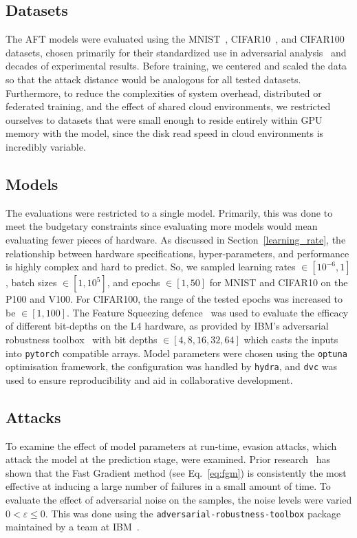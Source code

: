\documentclass[sn-mathphys-num]{sn-jnl}%
\begin{document}
\subsection{Datasets}

The AFT models were evaluated using the MNIST~\cite{mnist}, CIFAR10~\cite{cifar}, and CIFAR100~\cite{cifar} datasets, chosen primarily for their standardized use in adversarial analysis~\cite{madry2017towards,croce_reliable_2020,carlini_towards_2017,deepfool} and decades of experimental results.
Before training, we centered and scaled the data so that the attack distance would be analogous for all tested datasets. Furthermore, to reduce the complexities of system overhead, distributed or federated training, and the effect of shared cloud environments, we restricted ourselves to datasets that were small enough to reside entirely within GPU memory with the model, since the disk read speed in cloud environments is incredibly variable.


\subsection{Models}

The evaluations were restricted to a single model. Primarily, this was done to meet the budgetary constraints since evaluating more models would mean evaluating fewer pieces of hardware. As discussed in Section~\ref{learning_rate}, the relationship between hardware specifications, hyper-parameters, and performance is highly complex and hard to predict. So, we sampled learning rates $\in [10^{-6}, 1]$, batch sizes $\in [1, 10^5]$, and epochs $\in [1, 50]$ for MNIST and CIFAR10 on the P100 and V100. For CIFAR100, the range of the tested epochs was increased to be $\in [1, 100]$. The Feature Squeezing defence~\cite{feature_squeezing} was used to evaluate the efficacy of different bit-depths on the L4 hardware, as provided by IBM's adversarial robustness toolbox~\cite{art2018} with bit depths $\in [4,8,16,32,64]$ which casts the inputs into \texttt{pytorch} compatible arrays. Model parameters were chosen using the \texttt{optuna} optimisation framework, the configuration was handled by \texttt{hydra}, and \texttt{dvc} was used to ensure reproducibility and aid in collaborative development.


\subsection{Attacks}

To examine the effect of model parameters at run-time, evasion attacks, which attack the model at the prediction stage, were examined.
Prior research~\cite{meyers,meyers_aft} has shown that the Fast Gradient method (see Eq.~\ref{eq:fgm}) is consistently the most effective at inducing a large number of failures in a small amount of time.
To evaluate the effect of adversarial noise on the samples, the noise levels were varied $0 < \varepsilon  \leq 0$.
This was done using the \texttt{adversarial-robustness-toolbox} package maintained by a team at IBM~\cite{art2018}.
\end{document}
